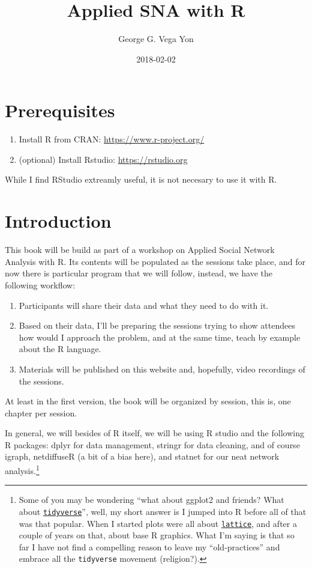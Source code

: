 \documentclass[]{book}
\title{Applied SNA with R}
\author{George G. Vega Yon}
\date{2018-02-02}
\let\rmarkdownfootnote\footnote%
\def\footnote{\protect\rmarkdownfootnote}
\theoremstyle{definition}
\theoremstyle{definition}
\theoremstyle{definition}
\theoremstyle{remark}
\begin{document}
\maketitle

{
\setcounter{tocdepth}{1}
\tableofcontents
}
\chapter{Prerequisites}\label{prerequisites}

\begin{enumerate}
\def\labelenumi{\arabic{enumi}.}
\item
  Install R from CRAN: \url{https://www.r-project.org/}
\item
  (optional) Install Rstudio: \url{https://rstudio.org}
\end{enumerate}

While I find RStudio extreamly useful, it is not necesary to use it with
R.

\chapter{Introduction}\label{intro}

This book will be build as part of a workshop on Applied Social Network
Analysis with R. Its contents will be populated as the sessions take
place, and for now there is particular program that we will follow,
instead, we have the following workflow:

\begin{enumerate}
\def\labelenumi{\arabic{enumi}.}
\item
  Participants will share their data and what they need to do with it.
\item
  Based on their data, I'll be preparing the sessions trying to show
  attendees how would I approach the problem, and at the same time,
  teach by example about the R language.
\item
  Materials will be published on this website and, hopefully, video
  recordings of the sessions.
\end{enumerate}

At least in the first version, the book will be organized by session,
this is, one chapter per session.

In general, we will besides of R itself, we will be using R studio and
the following R packages: dplyr for data management, stringr for data
cleaning, and of course igraph, netdiffuseR (a bit of a bias here), and
statnet for our neat network analysis.\footnote{Some of you may be
  wondering ``what about ggplot2 and friends? What about
  \href{https://www.tidyverse.org/}{\texttt{tidyverse}}'', well, my
  short answer is I jumped into R before all of that was that popular.
  When I started plots were all about
  \href{https://CRAN.R-project.org/package=lattice}{\texttt{lattice}},
  and after a couple of years on that, about base R graphics. What I'm
  saying is that so far I have not find a compelling reason to leave my
  ``old-practices'' and embrace all the \texttt{tidyverse} movement
  (religion?).}
\end{document}
